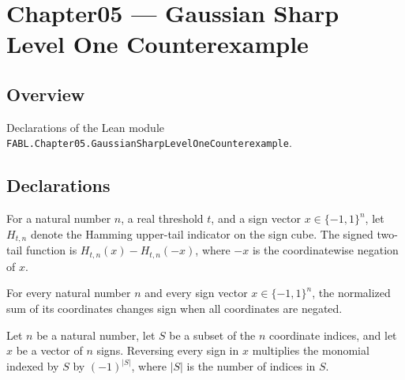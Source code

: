 \chapter{Chapter05 — Gaussian Sharp Level One Counterexample}
\section{Overview}

Declarations of the Lean module \texttt{FABL.Chapter05.GaussianSharpLevelOneCounterexample}.

\section{Declarations}

\begin{definition}
\label{FABL.signedHammingTwoTail}
\leanok
{}
For a natural number $n$, a real threshold $t$, and a sign vector $x\in\{-1,1\}^n$, let
$H_{t,n}$ denote the Hamming upper-tail indicator on the sign cube. The signed two-tail
function is $H_{t,n}(x)-H_{t,n}(-x)$, where $-x$ is the coordinatewise negation of $x$.
\end{definition}

\begin{theorem}
\label{FABL.normalizedRademacherSum_neg_counterexample}
\leanok
{}
For every natural number $n$ and every sign vector $x\in\{−1,1\}^n$, the normalized sum
of its coordinates changes sign when all coordinates are negated.
\end{theorem}

\begin{theorem}
\label{FABL.monomial_neg_input_counterexample}
\leanok
{}
Let $n$ be a natural number, let $S$ be a subset of the $n$ coordinate indices, and let
$x$ be a vector of $n$ signs. Reversing every sign in $x$ multiplies the monomial
indexed by $S$ by $(-1)^{|S|}$, where $|S|$ is the number of indices in $S$.
\end{theorem}

